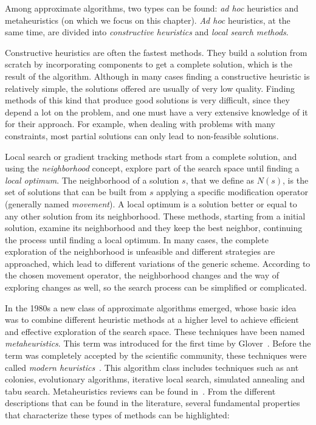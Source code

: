Among approximate algorithms, two types can be found: \emph{ad hoc} heuristics and metaheuristics (on which we focus on this chapter). \emph{Ad hoc} heuristics, at the same time, are divided into \emph{constructive heuristics} and \emph{local search methods}.

Constructive heuristics are often the fastest methods. They build a solution from scratch by incorporating components to get a complete solution, which is the result of the algorithm. Although in many cases finding a constructive heuristic is relatively simple, the solutions offered are usually of very low quality. Finding methods of this kind that produce good solutions is very difficult, since they depend a lot on the problem, and one must have a very extensive knowledge of it for their approach. For example, when dealing with problems with many constraints, most partial solutions can only lead to non-feasible solutions.

Local search or gradient tracking methods start from a complete solution, and using the \emph{neighborhood} concept, explore part of the search space until finding a \emph{local optimum}. The neighborhood of a solution $s$, that we define as $N(s)$, is the set of solutions that can be built from $s$ applying a specific modification operator (generally named \emph{movement}). A local optimum is a solution better or equal to any other solution from its neighborhood. These methods, starting from a initial solution, examine its neighborhood and they keep the best neighbor, continuing the process until finding a local optimum. In many cases, the complete exploration of the neighborhood is unfeasible and different strategies are approached, which lead to different variations of the generic scheme. According to the chosen movement operator, the neighborhood changes and the way of exploring changes as well, so the search process can be simplified or complicated.

In the 1980s a new class of approximate algorithms emerged, whose basic idea was to combine different heuristic methods at a higher level to achieve efficient and effective exploration of the search space. These techniques have been named \emph{metaheuristics}. This term was introduced for the first time by Glover~\cite{glover86future}. Before the term was completely accepted by the scientific community, these techniques were called \emph{modern heuristics}~\cite{reeves93modern}. This algorithm class includes techniques such as ant colonies, evolutionary algorithms, iterative local search, simulated annealing and tabu search. Metaheuristics reviews can be found in~\cite{blum03metaheuristics,glover03handbook}. From the different descriptions that can be found in the literature, several fundamental properties that characterize these types of methods can be highlighted:


